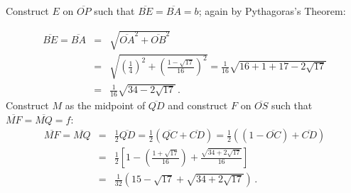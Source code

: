 Construct $E$ on $\overline{OP}$ such that $\overline{BE}=\overline{BA}=b$; again by Pythagoras's Theorem:

\begin{eqnarray*}
\overline{BE}=\overline{BA}&=&\sqrt{\overline{OA}^2+\overline{OB}^2}\\
&=&\sqrt{\left(\frac{1}{4}\right)^2+\left(\frac{1-\sqrt{17}}{16}\right)^2}=\frac{1}{16}\sqrt{16+1+17-2\sqrt{17}}\\
&=&\frac{1}{16}\sqrt{34-2\sqrt{17}}\,.
\end{eqnarray*}
Construct $M$ as the midpoint of $\overline{QD}$ and construct $F$ on $\overline{OS}$ such that $\overline{MF}=\overline{MQ}=f$:
%
\begin{eqnarray*}
\overline{MF}=\overline{MQ}&=&\frac{1}{2}\overline{QD}=\frac{1}{2}(\overline{QC}+\overline{CD})=\frac{1}{2}((1-\overline{OC})+\overline{CD})\\
&=&\frac{1}{2}\left[1-\left(\frac{1+\sqrt{17}}{16}\right)+\frac{\sqrt{34+2\sqrt{17}}}{16}\right]\\
&=&\frac{1}{32}\left(15-\sqrt{17}+\sqrt{34+2\sqrt{17}}\right)\,.
\end{eqnarray*}

